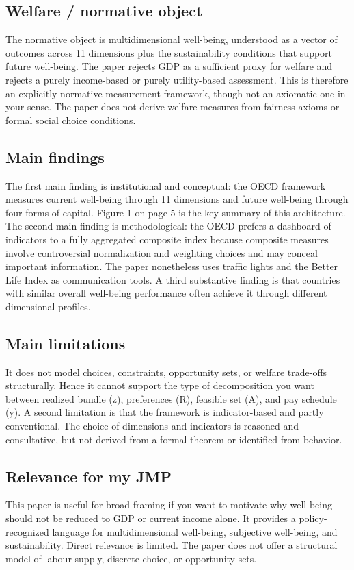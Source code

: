 \documentclass[11pt,a4paper]{article}
\begin{document}
\subsection*{Welfare / normative object}
The normative object is multidimensional well-being, understood as a vector of outcomes across 11 dimensions plus the sustainability conditions that support future well-being. The paper rejects GDP as a sufficient proxy for welfare and rejects a purely income-based or purely utility-based assessment. This is therefore an explicitly normative measurement framework, though not an axiomatic one in your sense. The paper does not derive welfare measures from fairness axioms or formal social choice conditions.

\subsection*{Main findings}
The first main finding is institutional and conceptual: the OECD framework measures current well-being through 11 dimensions and future well-being through four forms of capital. Figure 1 on page 5 is the key summary of this architecture. The second main finding is methodological: the OECD prefers a dashboard of indicators to a fully aggregated composite index because composite measures involve controversial normalization and weighting choices and may conceal important information. The paper nonetheless uses traffic lights and the Better Life Index as communication tools. A third substantive finding is that countries with similar overall well-being performance often achieve it through different dimensional profiles.

\subsection*{Main limitations}
It does not model choices, constraints, opportunity sets, or welfare trade-offs structurally. Hence it cannot support the type of decomposition you want between realized bundle (z), preferences (R), feasible set (A), and pay schedule (y). A second limitation is that the framework is indicator-based and partly conventional. The choice of dimensions and indicators is reasoned and consultative, but not derived from a formal theorem or identified from behavior.

\subsection*{Relevance for my JMP}
This paper is useful for broad framing if you want to motivate why well-being should not be reduced to GDP or current income alone. It provides a policy-recognized language for multidimensional well-being, subjective well-being, and sustainability. Direct relevance is limited. The paper does not offer a structural model of labour supply, discrete choice, or opportunity sets.
\end{document}
